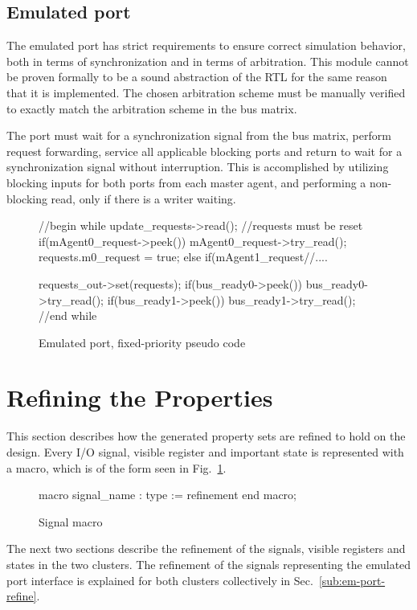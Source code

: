 \subsection{Emulated port}
\label{sub:portem}
The emulated port has strict requirements to ensure correct simulation behavior, both in terms of synchronization and in terms of arbitration. This module cannot be proven formally to be a sound abstraction of the RTL for the same reason that it is implemented. The chosen arbitration scheme must be manually verified to exactly match the arbitration scheme in the bus matrix. \par 
The port must wait for a synchronization signal from the bus matrix, perform request forwarding, service all applicable blocking ports and return to wait for a synchronization signal without interruption. This is accomplished by utilizing blocking inputs for both ports from each master agent, and performing a non-blocking read, only if there is a writer waiting. 
\begin{figure}[h!]
\begin{C++}
//begin while
update_requests->read(); 
//requests must be reset 
if(mAgent0_request->peek()){
mAgent0_request->try_read();
requests.m0_request = true;
}else if(mAgent1_request//....

requests_out->set(requests); 
if(bus_ready0->peek()) bus_ready0->try_read();
if(bus_ready1->peek()) bus_ready1->try_read();
//end while
\end{C++}
\caption{Emulated port, fixed-priority pseudo code}
\end{figure}

\section{Refining the Properties}
\label{sec:refine}
This section describes how the generated property sets are refined to hold on the design. Every I/O signal, visible register and important state is represented with a macro, which is of the form seen in Fig.~\ref{fig:macro}.
\begin{figure}[h!]
\begin{VHI}
macro signal_name : type := refinement end macro;
\end{VHI}
\caption{Signal macro}
\label{fig:macro}
\end{figure}

The next two sections describe the refinement of the signals, visible registers and states in the two clusters. The refinement of the signals representing the emulated port interface is explained for both clusters collectively in Sec.~\ref{sub:em-port-refine}.

